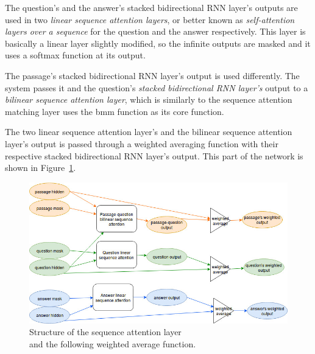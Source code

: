 The question's and the answer's stacked bidirectional RNN layer's outputs are used in two \textit{linear sequence attention layers}, or better known as \textit{self-attention layers over a sequence} for the question and the answer respectively. This layer is basically a linear layer slightly modified, so the infinite outputs are masked and it uses a softmax function at its output.

The passage's stacked bidirectional RNN layer's output is used differently. The system passes it and the question's \textit{stacked bidirectional RNN layer's} output to a \textit{bilinear sequence attention layer}, which is similarly to the sequence attention matching layer uses the bmm function as its core function.

The two linear sequence attention layer's and the bilinear sequence attention layer's output is passed through a weighted averaging function with their respective stacked bidirectional RNN layer's output. This part of the network is shown in Figure~\ref{fig:sequence_attention}.
\begin{figure}[h!]
	\centering
	\includegraphics[scale=0.5]{figures/TriAN_sequence_attention.jpg}
	\caption{Structure of the sequence attention layer\\and the following weighted average function.}
	\label{fig:sequence_attention}
\end{figure}

